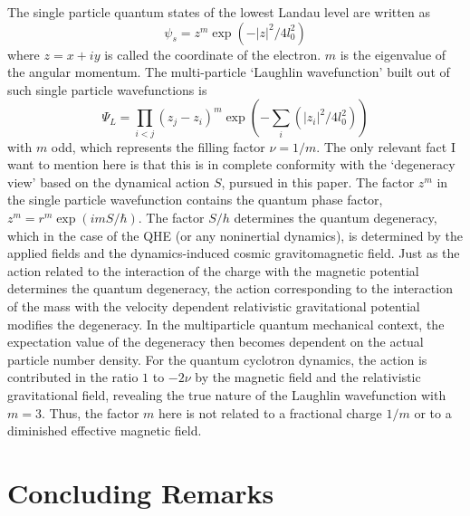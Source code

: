 \documentclass[aps,preprint,12pt,tightenlines]{revtex4}%
\begin{document}
The single particle quantum states of the lowest Landau level are written as
\begin{equation}
\psi_{s}=z^{m}\exp\left(  -\left\vert z\right\vert ^{2}/4l_{0}^{2}\right)
\end{equation}
where $z=x+iy$ is called the coordinate of the electron. $m$ is the eigenvalue
of the angular momentum. The multi-particle `Laughlin wavefunction'
\cite{Laughlin-1983} built out of such single particle wavefunctions is
\begin{equation}
\Psi_{L}=\prod\limits_{i<j}\left(  z_{j}-z_{i}\right)  ^{m}\exp\left(
-\sum\limits_{i}\left(  \left\vert z_{i}\right\vert ^{2}/4l_{0}^{2}\right)
\right)
\end{equation}
with $m$ odd, which represents the filling factor $\nu=1/m$. The only
relevant fact I want to mention here is that this is in complete conformity
with the `degeneracy view' based on the dynamical action $S$, pursued in
this paper. The factor $z^{m}$ in the single particle wavefunction contains
the quantum phase factor, $z^{m}=r^{m}\exp\left(imS/\hbar\right)$. The
factor $S/h$ determines the quantum degeneracy, which in the case of the QHE
(or any noninertial dynamics), is determined by the applied fields and the
dynamics-induced cosmic gravitomagnetic field. Just as the action related to
the interaction of the charge with the magnetic potential determines the
quantum degeneracy, the action corresponding to the interaction of the mass
with the velocity dependent relativistic gravitational potential modifies the
degeneracy. In the multiparticle quantum mechanical context, the expectation
value of the degeneracy then becomes dependent on the actual particle number
density. For the quantum cyclotron dynamics, the action is contributed in the
ratio $1$ to $-2\nu$ by the magnetic field and the relativistic gravitational
field, revealing the true nature of the Laughlin wavefunction with $m=3$.
Thus, the factor $m$ here is not related to a fractional charge $1/m$ or to a
diminished effective magnetic field.

\section{Concluding Remarks}
\end{document}

